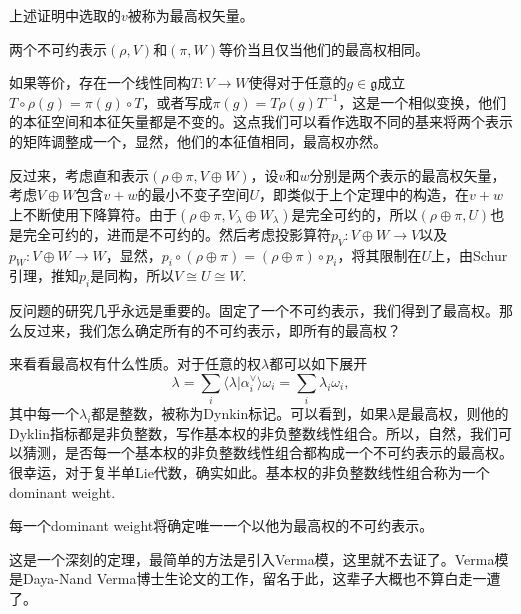 \documentclass[11pt]{article}
\theoremstyle{definition}
\theoremstyle{plain}
\newcommand{\lag}{{\mathfrak{g}}}
\begin{document}
上述证明中选取的$v$被称为最高权矢量。

{\thm 两个不可约表示$(\rho,V)$和$(\pi,W)$等价当且仅当他们的最高权相同。\endthm}

\proof 如果等价，存在一个线性同构$T:V\to W$使得对于任意的$g\in\lag$成立$T\circ \rho(g)=\pi(g)\circ T$，或者写成$\pi(g)=T\rho(g)T^{-1}$，这是一个相似变换，他们的本征空间和本征矢量都是不变的。这点我们可以看作选取不同的基来将两个表示的矩阵调整成一个，显然，他们的本征值相同，最高权亦然。

反过来，考虑直和表示$(\rho\oplus\pi,V\oplus W)$，设$v$和$w$分别是两个表示的最高权矢量，考虑$V\oplus W$包含$v+w$的最小不变子空间$U$，即类似于上个定理中的构造，在$v+w$上不断使用下降算符。由于$(\rho\oplus\pi,V_\lambda\oplus W_\lambda)$是完全可约的，所以$(\rho\oplus\pi,U)$也是完全可约的，进而是不可约的。然后考虑投影算符$p_V:V\oplus W\to V$以及$p_W:V\oplus W\to W$，显然，$p_i\circ (\rho\oplus\pi)=(\rho\oplus\pi)\circ p_i$，将其限制在$U$上，由Schur引理，推知$p_i$是同构，所以$V\cong U\cong W$. \endproof

\para 反问题的研究几乎永远是重要的。固定了一个不可约表示，我们得到了最高权。那么反过来，我们怎么确定所有的不可约表示，即所有的最高权？

来看看最高权有什么性质。对于任意的权$\lambda$都可以如下展开
\[
	\lambda=\sum_i \langle \lambda|\alpha_i^\vee\rangle \omega_i=\sum_i \lambda_i \omega_i,
\]
其中每一个$\lambda_i$都是整数，被称为Dynkin标记。可以看到，如果$\lambda$是最高权，则他的Dyklin指标都是非负整数，写作基本权的非负整数线性组合。所以，自然，我们可以猜测，是否每一个基本权的非负整数线性组合都构成一个不可约表示的最高权。很幸运，对于复半单Lie代数，确实如此。基本权的非负整数线性组合称为一个dominant weight.



{\thm 每一个dominant weight将确定唯一一个以他为最高权的不可约表示。\endthm}

这是一个深刻的定理，最简单的方法是引入Verma模，这里就不去证了。Verma模是Daya-Nand Verma博士生论文的工作，留名于此，这辈子大概也不算白走一遭了。
\end{document}
